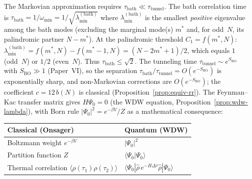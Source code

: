 The Markovian approximation requires
$\tau_{\mathrm{bath}} \ll \tau_{\mathrm{tunnel}}$.
The bath correlation time is
$\tau_{\mathrm{bath}} = 1/\omega_{\min}
= 1/\sqrt{\lambda_{\min}^{(\mathrm{bath})}}$
where $\lambda_{\min}^{(\mathrm{bath})}$ is the
smallest \emph{positive} eigenvalue among the bath modes
(excluding the marginal mode(s) $m^*$
and, for odd~$N$, its palindromic partner $N{-}m^*$).
At the palindromic threshold $C_1 = f(m^*,N)$:
$\lambda_{\min}^{(\mathrm{bath})}
= f(m^*,N) - f(m^*{-}1,N)
= (N{-}2m^*{+}1)/2$,
which equals $1$ (odd~$N$) or $1/2$ (even~$N$).
Thus $\tau_{\mathrm{bath}} \le \sqrt{2}$.
The tunneling time $\tau_{\mathrm{tunnel}}
\sim e^{S_{\mathrm{BO}}}$ with $S_{\mathrm{BO}} \gg 1$
(Paper~VI), so the separation
$\tau_{\mathrm{bath}}/\tau_{\mathrm{tunnel}}
= O(e^{-S_{\mathrm{BO}}})$ is exponentially sharp, and
non-Markovian corrections are $O(e^{-S_{\mathrm{BO}}})$;
the coefficient $c = 12\,b(N)$ is classical
(Proposition~\ref{prop:equiv-rr}).
The Feynman--Kac transfer matrix gives $H\Psi_0 = 0$
(the WDW equation, Proposition~\ref{prop:wdw-lambda}), with Born rule
$|\Psi_0|^2 = e^{-\beta V}/Z$ as a mathematical consequence:
\begin{center}
\small
\begin{tabular}{ll}
\toprule
Classical (Onsager) & Quantum (WDW) \\
\midrule
Boltzmann weight $e^{-\beta V}$ & $|\Psi_0|^2$ \\
Partition function $Z$ & $\langle\Psi_0|\Psi_0\rangle$ \\
Thermal correlation $\langle\rho(\tau_1)\rho(\tau_2)\rangle$
  & $\langle\Psi_0|\hat\rho\,e^{-H\Delta\tau}\hat\rho|\Psi_0\rangle$ \\
\bottomrule
\end{tabular}
\end{center}
\noindent
